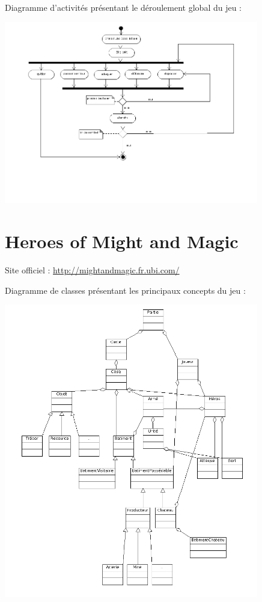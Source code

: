 \documentclass[a4paper,10pt]{report}
\begin{document}
    Diagramme d'activités présentant le déroulement global du jeu : 
    
    \includegraphics[width=420px]{diagrammes/Dofus_ActivityDiagram.png}
    

	\section{Heroes of Might and Magic}
	
    Site officiel : \url{http://mightandmagic.fr.ubi.com/}

    Diagramme de classes présentant les principaux concepts du jeu : 
    
		\includegraphics[width=420px]{diagrammes/heroes_of_might_and_magic.png}
\end{document}
